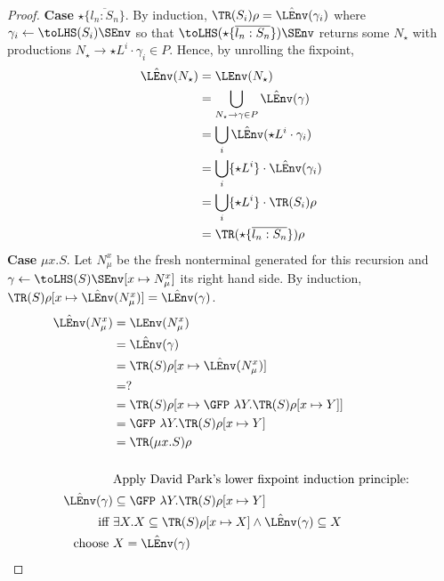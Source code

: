 \begin{proof}
  \textbf{Case }$\star \{ \overline{l_n:S_n} \}$. By induction, $\TR (S_i) \rho = \hat\LEnv
  (\gamma_i)$ where $\gamma_i \gets \toLHS (S_i)\SEnv$ so that $\toLHS (\star \{ \overline{l_n:S_n}
  \})\SEnv$ returns some $N_\star$ with productions $N_\star \to \star L^i \cdot \gamma_i \in P$.
  Hence, by unrolling the fixpoint, 
  \begin{align*}
    \hat\LEnv (N_\star) & = \LEnv (N_\star) \\
                        & = \bigcup_{N_\star \to \gamma \in P} \hat\LEnv  (\gamma) \\
                        &= \bigcup_i \hat\LEnv (\star L^i \cdot \gamma_i)  \\
                        &=\bigcup_i \{\star L^i\} \cdot\hat\LEnv (\gamma_i)  \\
                        &=\bigcup_i \{\star L^i\} \cdot\TR (S_i)\rho  \\
                        &=\TR( \star\{ \overline{ l_n: S_n}\} )\rho
  \end{align*}
\clearpage
  \textbf{Case }$\mu x.S$.
  Let $N_\mu^x$ be the fresh nonterminal generated for this recursion and
  $\gamma \gets \toLHS (S)\SEnv[x \mapsto N_\mu^x]$ its right hand side.
  By induction,
  $\TR (S) \rho[x \mapsto \hat\LEnv (N_\mu^x)] = \hat\LEnv(\gamma)$.
  \begin{align*}
    \hat\LEnv (N_\mu^x) &= \LEnv (N_\mu^x) \\
                        &= \hat\LEnv (\gamma) \\
                        &= \TR (S) \rho[x \mapsto \hat\LEnv (N_\mu^x)] \\
                        &=? \\
                        &= \TR (S) \rho[x \mapsto \GFP\ \lambda Y. \TR (S)\rho[x \mapsto Y]] \\
                        &= \GFP\ \lambda Y. \TR (S) \rho[x \mapsto Y] \\
                        &= \TR (\mu x.S)\rho \\
                        &\\
    & \text{Apply David Park's lower fixpoint induction principle:} \\
    \hat\LEnv (\gamma) & \subseteq \GFP\ \lambda Y. \TR (S) \rho[x \mapsto Y] \\
    \text{iff } & \exists X. X \subseteq \TR (S) \rho[x \mapsto X] \wedge \hat\LEnv (\gamma)
                   \subseteq X \\
    \text{choose } & X = \hat\LEnv (\gamma) \\

\end{align*}
\end{proof}

